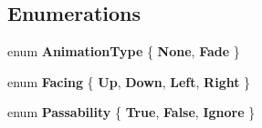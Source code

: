 \subsection*{Enumerations}
\begin{DoxyCompactItemize}
\item 
\hypertarget{namespace_simple_r_p_g_aa2006fe11fa47a3e4721bf6a3dae3f55}{enum {\bfseries Animation\+Type} \{ {\bfseries None}, 
{\bfseries Fade}
 \}}\label{namespace_simple_r_p_g_aa2006fe11fa47a3e4721bf6a3dae3f55}

\item 
\hypertarget{namespace_simple_r_p_g_abe65938b504a8354d61776aebf895f6d}{enum {\bfseries Facing} \{ {\bfseries Up}, 
{\bfseries Down}, 
{\bfseries Left}, 
{\bfseries Right}
 \}}\label{namespace_simple_r_p_g_abe65938b504a8354d61776aebf895f6d}

\item 
\hypertarget{namespace_simple_r_p_g_a5f1ec21e7f4e36278a6cedd38c51e650}{enum {\bfseries Passability} \{ {\bfseries True}, 
{\bfseries False}, 
{\bfseries Ignore}
 \}}\label{namespace_simple_r_p_g_a5f1ec21e7f4e36278a6cedd38c51e650}

\end{DoxyCompactItemize}
